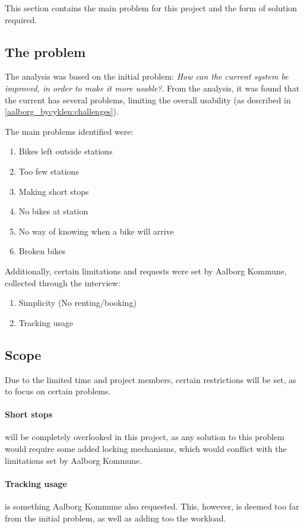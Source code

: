 This section contains the main problem for this project and the form of solution required.

\subsection{The problem}
The analysis was based on the initial problem: \textit{How can the current \citybike system be improved, in order to make it more usable?}.
From the analysis, it was found that the current \citybike has several problems, limiting the overall usability (as described in \cref{aalborg_bycyklen:challenges}).

The main problems identified were:
\begin{enumerate}
\item Bikes left outside stations
\item Too few stations
\item Making short stops
\item No bikes at station
\item No way of knowing when a bike will arrive
\item Broken bikes
\end{enumerate}

Additionally, certain limitations and requests were set by Aalborg Kommune, collected through the interview:

\begin{enumerate}
\item Simplicity (No renting/booking)
\item Tracking usage
\end{enumerate}

\subsection{Scope}
Due to the limited time and project members, certain restrictions will be set, as to focus on certain problems.

\paragraph{Short stops} will be completely overlooked in this project, as any solution to this problem would require some added locking mechanisms, which would conflict with the limitations set by Aalborg Kommune.

\paragraph{Tracking usage} is something Aalborg Kommune also requested.
This, however, is deemed too far from the initial problem, as well as adding too the workload.

